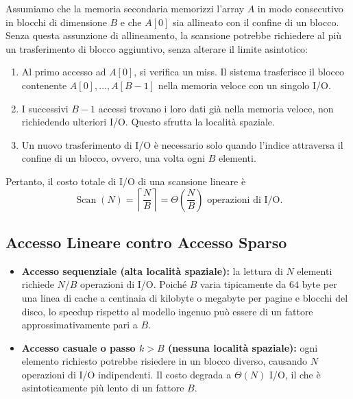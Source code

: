 Assumiamo che la memoria secondaria memorizzi l'array $A$ in modo consecutivo in blocchi di dimensione $B$ e che $A[0]$ sia allineato con il confine di un blocco. Senza questa assunzione di allineamento, la scansione potrebbe richiedere al più un trasferimento di blocco aggiuntivo, senza alterare il limite asintotico:

\begin{enumerate}
  \item Al primo accesso ad $A[0]$, si verifica un miss. Il sistema trasferisce il blocco contenente $A[0], \ldots, A[B-1]$ nella memoria veloce con un singolo I/O.
  \item I successivi $B-1$ accessi trovano i loro dati già nella memoria veloce, non richiedendo ulteriori I/O. Questo sfrutta la località spaziale.
  \item Un nuovo trasferimento di I/O è necessario solo quando l'indice attraversa il confine di un blocco, ovvero, una volta ogni $B$ elementi.
\end{enumerate}

Pertanto, il costo totale di I/O di una scansione lineare è
\[
  \operatorname{Scan}(N) = \left\lceil \frac{N}{B} \right\rceil
  = \Theta\!\left(\frac{N}{B}\right)\text{ operazioni di I/O}.
\]

\subsection{Accesso Lineare contro Accesso Sparso}

\begin{itemize}
  \item \textbf{Accesso sequenziale (alta località spaziale):} la lettura di $N$ elementi richiede $N/B$ operazioni di I/O. Poiché $B$ varia tipicamente da $64$ byte per una linea di cache a centinaia di kilobyte o megabyte per pagine e blocchi del disco, lo speedup rispetto al modello ingenuo può essere di un fattore approssimativamente pari a $B$.
  \item \textbf{Accesso casuale o passo $k>B$ (nessuna località spaziale):} ogni elemento richiesto potrebbe risiedere in un blocco diverso, causando $N$ operazioni di I/O indipendenti. Il costo degrada a $\Theta(N)$ I/O, il che è asintoticamente più lento di un fattore $B$.
\end{itemize}
